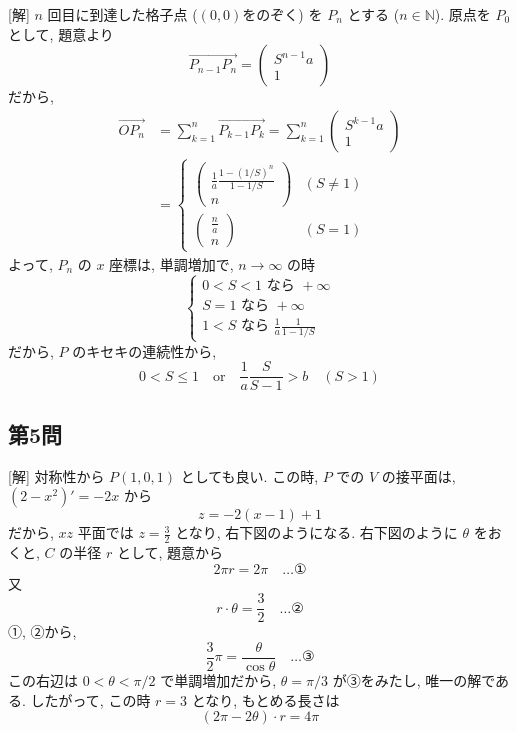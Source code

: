 \documentclass[../main.tex]{subfiles}
\begin{document}
[解] $n$ 回目に到達した格子点 ($(0,0)$をのぞく) を $P_n$ とする ($n \in \mathbb{N}$). 原点を $P_0$ として, 題意より
\[
  \vec{P_{n-1} P_n} =
  \begin{pmatrix} S^{n-1} a \\ 1
  \end{pmatrix}
\]
だから,
\begin{align*}
  \vec{OP_n} &= \sum_{k=1}^n \vec{P_{k-1} P_k} = \sum_{k=1}^n
  \begin{pmatrix} S^{k-1} a \\ 1
  \end{pmatrix} \\
  &=
  \begin{cases}
    \begin{pmatrix} \frac{1}{a} \frac{1-(1/S)^n}{1-1/S} \\ n
    \end{pmatrix} & (S \ne 1) \\[10pt]
    \begin{pmatrix} \frac{n}{a} \\ n
    \end{pmatrix} & (S=1)
  \end{cases}
\end{align*}
よって, $P_n$ の $x$ 座標は, 単調増加で, $n \to \infty$ の時
\[
  \begin{cases}
    0 < S < 1 \text{ なら } +\infty \\
    S = 1 \text{ なら } +\infty \\
    1 < S \text{ なら } \frac{1}{a} \frac{1}{1-1/S}
  \end{cases}
\]
だから, $P$ のキセキの連続性から,
\[
  0 < S \le 1 \quad \text{or} \quad \frac{1}{a} \frac{S}{S-1} > b \quad (S > 1)
\]

\subsection*{第5問}

[解] 対称性から $P(1, 0, 1)$ としても良い. この時, $P$ での $V$ の接平面は, $(2-x^2)' = -2x$ から
\[
  z = -2(x-1) + 1
\]
だから, $xz$ 平面では $z = \frac{3}{2}$ となり, 右下図のようになる.
右下図のように $\theta$ をおくと, $C$ の半径 $r$ として, 題意から
\[
  2\pi r = 2\pi \quad \dots \text{①}
\]
又
\[
  r \cdot \theta = \frac{3}{2} \quad \dots \text{②}
\]
①, ②から,
\[
  \frac{3}{2}\pi = \frac{\theta}{\cos\theta} \quad \dots \text{③}
\]
この右辺は $0 < \theta < \pi/2$ で単調増加だから, $\theta = \pi/3$ が③をみたし, 唯一の解である. したがって, この時 $r = 3$ となり, もとめる長さは
\[
  (2\pi - 2\theta) \cdot r = 4\pi
\]
\end{document}
